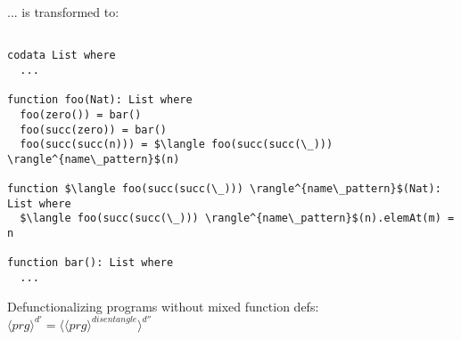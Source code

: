 \documentclass[11pt]{article} %
\begin{document}
... is transformed to:

\begin{lstlisting}[mathescape]

codata List where
  ...

function foo(Nat): List where
  foo(zero()) = bar()
  foo(succ(zero)) = bar()
  foo(succ(succ(n))) = $\langle foo(succ(succ(\_))) \rangle^{name\_pattern}$(n)

function $\langle foo(succ(succ(\_))) \rangle^{name\_pattern}$(Nat): List where
  $\langle foo(succ(succ(\_))) \rangle^{name\_pattern}$(n).elemAt(m) = n

function bar(): List where
  ...

\end{lstlisting}

Defunctionalizing programs without mixed function defs: $\langle prg \rangle^{d'} = \langle \langle prg \rangle^{disentangle} \rangle^{d''}$
\end{document}
